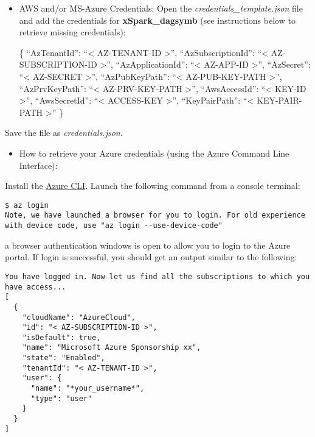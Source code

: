 \documentclass[
]{article}
\providecommand{\tightlist}{%
  \setlength{\itemsep}{0pt}\setlength{\parskip}{0pt}}
\begin{document}
\begin{itemize}
\item
  AWS and/or MS-Azure Credentials: Open the
  \emph{credentials\_template.json} file and add the credentials for
  \textbf{xSpark\_dagsymb} (see instructions below to retrieve missing
  credentials):

  \{ ``AzTenantId'': ``\textless{} AZ-TENANT-ID \textgreater{}'',
  ``AzSubscriptionId'': ``\textless{} AZ-SUBSCRIPTION-ID
  \textgreater{}'', ``AzApplicationId'': ``\textless{} AZ-APP-ID
  \textgreater{}'', ``AzSecret'': ``\textless{} AZ-SECRET
  \textgreater{}'', ``AzPubKeyPath'': ``\textless{} AZ-PUB-KEY-PATH
  \textgreater{}'', ``AzPrvKeyPath'': ``\textless{} AZ-PRV-KEY-PATH
  \textgreater{}'', ``AwsAccessId'': ``\textless{} KEY-ID
  \textgreater{}'', ``AwsSecretId'': ``\textless{} ACCESS-KEY
  \textgreater{}'', ``KeyPairPath'': ``\textless{} KEY-PAIR-PATH
  \textgreater{}'' \}
\end{itemize}

Save the file as \emph{credentials.json}.

\begin{itemize}
\tightlist
\item
  How to retrieve your Azure credentials (using the Azure Command Line
  Interface):
\end{itemize}

Install the
\href{https://docs.microsoft.com/it-it/cli/azure/install-azure-cli?view=azure-cli-latest}{Azure
CLI}. Launch the following command from a console terminal:

\begin{verbatim}
$ az login
Note, we have launched a browser for you to login. For old experience with device code, use "az login --use-device-code"
\end{verbatim}

a browser authentication windows is open to allow you to login to the
Azure portal. If login is successful, you should get an output similar
to the following:

\begin{verbatim}
You have logged in. Now let us find all the subscriptions to which you have access...
[
  {
    "cloudName": "AzureCloud",
    "id": "< AZ-SUBSCRIPTION-ID >",
    "isDefault": true,
    "name": "Microsoft Azure Sponsorship xx",
    "state": "Enabled",
    "tenantId": "< AZ-TENANT-ID >",
    "user": {
      "name": "*your_username*",
      "type": "user"
    }
  }
]
\end{verbatim}
\end{document}
